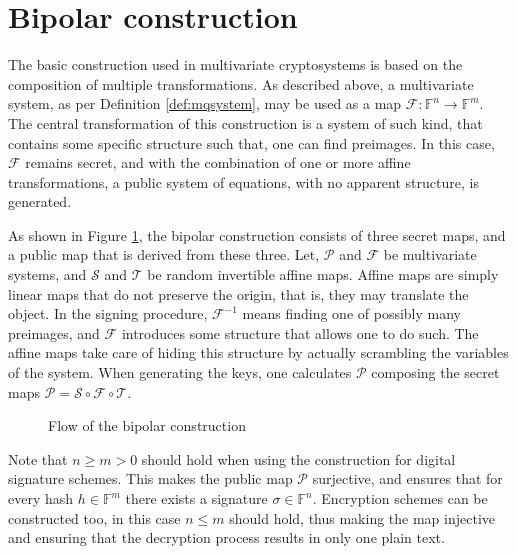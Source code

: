 \documentclass{ufsctex/ufsctex}
\begin{document}
\section{Bipolar construction}\label{sec:bipolar}

The basic construction used in multivariate cryptosystems is based on the
composition of multiple transformations. As described above, a multivariate
system, as per Definition \ref{def:mqsystem}, may be used as a map
$\mathcal{F}:\mathbb{F}^n\to\mathbb{F}^m$. The central transformation of this
construction is a system of such kind, that contains some specific structure
such that, one can find preimages. In this case, $\mathcal{F}$ remains secret,
and with the combination of one or more affine transformations, a public system
of equations, with no apparent structure, is generated.

As shown in Figure \ref{fig:bipolar}, the bipolar construction consists of
three secret maps, and a public map that is derived from these three. Let,
$\mathcal{P}$ and $\mathcal{F}$ be multivariate systems, and $\mathcal{S}$ and
$\mathcal{T}$ be random invertible affine maps. Affine maps are simply linear
maps that do not preserve the origin, that is, they may translate the object.
In the signing procedure, $\mathcal{F}^{-1}$ means finding one of possibly many
preimages, and $\mathcal{F}$ introduces some structure that allows one to do
such. The affine maps take care of hiding this structure by actually scrambling
the variables of the system. When generating the keys, one calculates
$\mathcal{P}$ composing the secret maps $\mathcal{P} = \mathcal{S} \circ
\mathcal{F} \circ \mathcal{T}$.

\begin{figure}
\centering
{}
\caption{Flow of the bipolar construction}\label{fig:bipolar}
\end{figure}

Note that $n \geq m > 0$ should hold when using the construction for digital
signature schemes. This makes the public map $\mathcal{P}$ surjective, and
ensures that for every hash $h \in \mathbb{F}^m$ there exists a signature
$\sigma \in \mathbb{F}^n$. Encryption schemes can be constructed too, in this
case $n \leq m$ should hold, thus making the map injective and ensuring that
the decryption process results in only one plain text.
\end{document}
